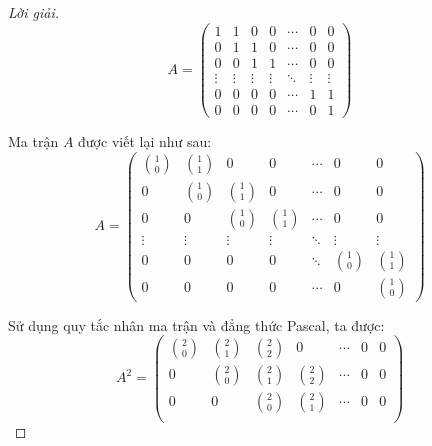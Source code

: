 \documentclass[class=linearalgebra,crop=false]{standalone}
\begin{document}
\begin{proof}[Lời giải]
    \[
        A =
        \begin{pmatrix}
            1      & 1      & 0      & 0      & \cdots & 0      & 0      \\
            0      & 1      & 1      & 0      & \cdots & 0      & 0      \\
            0      & 0      & 1      & 1      & \cdots & 0      & 0      \\
            \vdots & \vdots & \vdots & \vdots & \ddots & \vdots & \vdots \\
            0      & 0      & 0      & 0      & \cdots & 1      & 1      \\
            0      & 0      & 0      & 0      & \cdots & 0      & 1
        \end{pmatrix}
    \]
    \par Ma trận $A$ được viết lại như sau:
    \[
        A =
        \begin{pmatrix}
            \binom{1}{0} & \binom{1}{1} & 0            & 0            & \cdots & 0            & 0            \\
            0            & \binom{1}{0} & \binom{1}{1} & 0            & \cdots & 0            & 0            \\
            0            & 0            & \binom{1}{0} & \binom{1}{1} & \cdots & 0            & 0            \\
            \vdots       & \vdots       & \vdots       & \vdots       & \ddots & \vdots       & \vdots       \\
            0            & 0            & 0            & 0            & \ddots & \binom{1}{0} & \binom{1}{1} \\
            0            & 0            & 0            & 0            & \cdots & 0            & \binom{1}{0}
        \end{pmatrix}
    \]
    \par Sử dụng quy tắc nhân ma trận và đẳng thức Pascal, ta được:
    \[
        A^{2} =
        \begin{pmatrix}
            \binom{2}{0} & \binom{2}{1} & \binom{2}{2} & 0            & \cdots & 0            & 0            \\
            0            & \binom{2}{0} & \binom{2}{1} & \binom{2}{2} & \cdots & 0            & 0            \\
            0            & 0            & \binom{2}{0} & \binom{2}{1} & \cdots & 0            & 0            \\

\end{pmatrix}\]
\end{proof}
\end{document}
